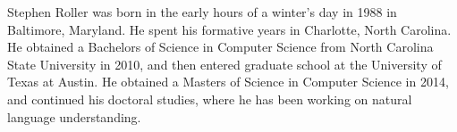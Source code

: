 \documentclass[10pt,twoside,openright,cleardoublepage=empty]{report}
\renewcommand{\chosenspacing}{\oneandhalfspace}  %
\renewcommand{\thesisdedication}{To my sisters, Lindsey and Kacie.}
\begin{document}
\thesiscopyrightpage                 %

\thesiscertificationpage             %

\thesistitlepage                     %


\thesisdedicationpage                %

\renewcommand{\thesisdedication}{\parbox[c]{0.75\textwidth}{``I don't know the meaning of half those long words, and, what's more,
    I don't believe you do either!''\begin{flushright}-- Lewis Carroll, \textit{Alice's Adventures in
Wonderland}\end{flushright}}}
\thesisdedicationpage                %

\begin{thesisacknowledgments}        %

\end{thesisacknowledgments}          %


\begin{thesisabstract}               %
\chosenspacing
\indent
\end{thesisabstract}

\cleardoublepage
\tableofcontents                     %






\cleardoublepage
{}
{}  %
\singlespace



\begin{thesisauthorvita}
Stephen Roller was born in the early hours of a winter's day in 1988 in
Baltimore, Maryland. He spent his formative years in Charlotte, North
Carolina. He obtained a Bachelors of Science in Computer Science from
North Carolina State University in 2010, and then entered graduate school
at the University of Texas at Austin. He obtained a Masters of Science in
Computer Science in 2014, and continued his doctoral studies, where he
has been working on natural language understanding.
\end{thesisauthorvita}
\end{document}
